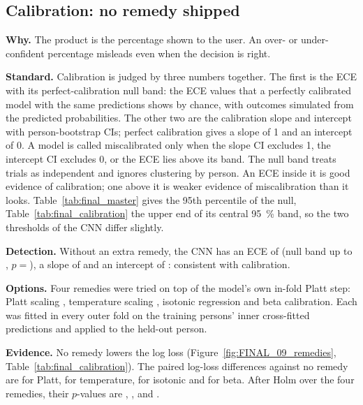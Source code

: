 
\subsection{Calibration: no remedy shipped}\label{app:final:calibration}

\textbf{Why.}
The product is the percentage shown to the user.
An over- or under-confident percentage misleads even when the decision is right.

\textbf{Standard.}
Calibration is judged by three numbers together.
The first is the ECE with its perfect-calibration null band: the ECE values that a perfectly calibrated model with the same predictions shows by chance, with outcomes simulated from the predicted probabilities.
The other two are the calibration slope and intercept with person-bootstrap CIs; perfect calibration gives a slope of 1 and an intercept of 0.
A model is called miscalibrated only when the slope CI excludes 1, the intercept CI excludes 0, or the ECE lies above its band.
The null band treats trials as independent and ignores clustering by person.
An ECE inside it is good evidence of calibration; one above it is weaker evidence of miscalibration than it looks.
Table~\ref{tab:final_master} gives the 95th percentile of the null, Table~\ref{tab:final_calibration} the upper end of its central 95~\% band, so the two thresholds of the CNN differ slightly.

\textbf{Detection.}
Without an extra remedy, the CNN has an ECE of  (null band up to , $p = {}$), a slope of  and an intercept of : consistent with calibration.

\textbf{Options.}
Four remedies were tried on top of the model's own in-fold Platt step: Platt scaling \cite{platt1999probabilistic}, temperature scaling \cite{guo2017calibration}, isotonic regression and beta calibration.
Each was fitted in every outer fold on the training persons' inner cross-fitted predictions and applied to the held-out person.

\textbf{Evidence.}
No remedy lowers the log loss (Figure~\ref{fig:FINAL_09_remedies}, Table~\ref{tab:final_calibration}).
The paired log-loss differences against no remedy are  for Platt,  for temperature,  for isotonic and  for beta.
After Holm over the four remedies, their $p$-values are , ,  and .

